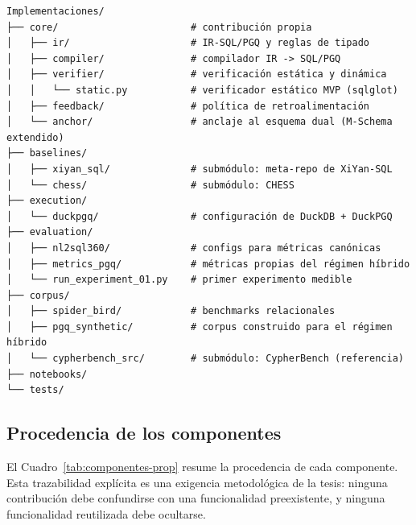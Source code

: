 \begin{verbatim}
Implementaciones/
├── core/                       # contribución propia
│   ├── ir/                     # IR-SQL/PGQ y reglas de tipado
│   ├── compiler/               # compilador IR -> SQL/PGQ
│   ├── verifier/               # verificación estática y dinámica
│   │   └── static.py           # verificador estático MVP (sqlglot)
│   ├── feedback/               # política de retroalimentación
│   └── anchor/                 # anclaje al esquema dual (M-Schema extendido)
├── baselines/
│   ├── xiyan_sql/              # submódulo: meta-repo de XiYan-SQL
│   └── chess/                  # submódulo: CHESS
├── execution/
│   └── duckpgq/                # configuración de DuckDB + DuckPGQ
├── evaluation/
│   ├── nl2sql360/              # configs para métricas canónicas
│   ├── metrics_pgq/            # métricas propias del régimen híbrido
│   └── run_experiment_01.py    # primer experimento medible
├── corpus/
│   ├── spider_bird/            # benchmarks relacionales
│   ├── pgq_synthetic/          # corpus construido para el régimen híbrido
│   └── cypherbench_src/        # submódulo: CypherBench (referencia)
├── notebooks/
└── tests/
\end{verbatim}

\subsection{Procedencia de los componentes}
\label{subsec:prop-procedencia}

El Cuadro~\ref{tab:componentes-prop} resume la procedencia de cada componente. Esta trazabilidad explícita es una exigencia metodológica de la tesis: ninguna contribución debe confundirse con una funcionalidad preexistente, y ninguna funcionalidad reutilizada debe ocultarse.

